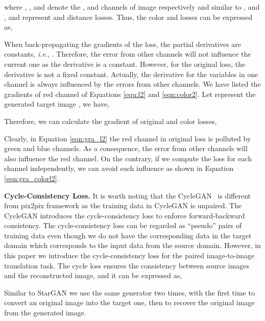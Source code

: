 \documentclass[sigconf]{acmart}
\begin{document}
\vspace{-0.3cm}

where , ,  and  denote the ,  and  channels of image  respectively and similar to ,  and ,  and  represent  and  distance losses.
Thus, the color  and  losses can be expressed as, 


When back-propagating the gradients of the  loss, the partial derivatives are constants, \emph{i.e.}, . 
Therefore, the error from other channels will not influence the current one as the derivative is a constant.
However, for the original  loss, the derivative is not a fixed constant. Actually, the derivative for the variables in one channel is always influenced by the errors from other channels. 
We have listed the gradients of red channel of Equations \ref{equ:l2} and \ref{eqn:color2}. Let  represent the generated target image , we have,
\vspace{-0.2cm}



Therefore, we can calculate the gradient of original  and color  losses, 

\vspace{-0.2cm}


Clearly, in Equation \ref{eqn:gra_l2} the red channel in original  loss is polluted by green and blue channels. As a consequence, the error from other channels will also influence the red channel. 
On the contrary, if we compute the loss for each channel independently, we can avoid such influence as shown in Equation \ref{eqn:gra_colorl2}.

\noindent \textbf{Cycle-Consistency Loss.}
It is worth noting that the CycleGAN~\cite{zhu2017unpaired} is different from pix2pix framework \cite{isola2017image} as the training data in CycleGAN is unpaired. 
The CycleGAN introduces the cycle-consistency loss to enforce forward-backward consistency.
The cycle-consistency loss can be regarded as ``pseudo'' pairs of training data even though we do not have the corresponding data in the target domain which corresponds to the input data from the source domain.
However, in this paper we introduce the cycle-consistency loss for the paired image-to-image translation task.
The cycle loss ensures the consistency between source images and the reconstructed image, and it can be expressed as,

Similar to StarGAN \cite{choi2017stargan} we use the same generator  two times, with the first time to convert an original image into the target one, then to recover the original image from the generated image.
\end{document}
